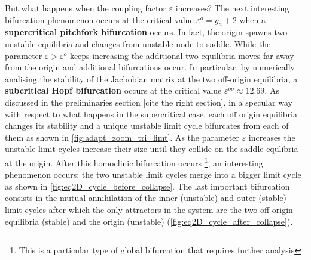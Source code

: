 But what happens when the coupling factor $\varepsilon$ increases? The next interesting bifurcation phenomenon occurs at the critical value $\varepsilon^o = g_a + 2$ when a \textbf{supercritical pitchfork bifurcation} occurs. In fact, the origin spawns two unstable equilibria and changes from unstable node to saddle. While the parameter $\varepsilon > \varepsilon^o$ keeps increasing the additional two equilibria moves far away from the origin and additional bifurcations occur. In particular, by numerically analising the stability of the Jacbobian matrix at the two off-origin equilibria, a \textbf{subcritical Hopf bifurcation} occurs at the critical value $\varepsilon^{oo} \approx 12.69$. As discussed in the preliminaries section [cite the right section], in a specular way with respect to what happens in the supercritical case, each off origin equilibria changes its stability and a unique unstable limit cycle bifurcates from each of them as shown in \cref{fig:adapt_zoom_tri_limt}. As the parameter $\varepsilon$ increases the unstable limit cycles increase their size until they collide on the saddle equlibria at the origin. After this homoclinic bifurcation occurs \footnote{This is a particular type of global bifurcation that requires further analysis},
 an interesting phenomenon occurs: the two unstable limit cycles merge into a bigger limit cycle as shown in \cref{fig:eq2D_cycle_before_collapse}. The last important bifurcation consists in the mutual annihilation of the inner (unstable) and outer (stable) limit cycles after which the only attractors in the system are the two off-origin equilibria (stable) and the origin (unstable) (\cref{fig:eq2D_cycle_after_collapse}).

